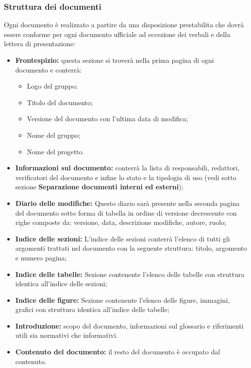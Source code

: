 \documentclass[NormeDiProgetto.tex]{subfiles}
\begin{document}
	\subsubsection{Struttura dei documenti}
		Ogni documento è realizzato a partire da una disposizione prestabilita che dovrà essere conforme per ogni documento ufficiale ad eccezione dei verbali e della lettera di presentazione:
		\begin{itemize}
			\item \textbf{Frontespizio:} questa sezione si troverà nella prima pagina di ogni documento e conterrà:
			\begin{itemize}
				\item Logo del gruppo;
				\item Titolo del documento;
				\item Versione del documento con l'ultima data di modifica;
				\item Nome del gruppo;
				\item Nome del progetto.
			\end{itemize}
			
			\item \textbf{Informazioni sul documento:} conterrà la lista di responsabili,
			redattori, verificatori del documento e infine lo stato e la tipologia di uso (vedi sotto sezione \textbf{Separazione documenti interni ed esterni});
			
			\item \textbf{Diario delle modifiche:}
			Questo diario sarà presente nella seconda pagina del documento sotto forma di tabella in ordine di versione decrescente con righe composte da: versione, data, descrizione modifiche, autore, ruolo;
			
			\item \textbf{Indice delle sezioni:}
			L'indice delle sezioni conterrà l'elenco di tutti gli argomenti trattati nel documento con la seguente struttura: titolo, argomento e numero pagina;
			
			\item \textbf{Indice delle tabelle:}
			Sezione contenente l'elenco delle tabelle con struttura identica all'indice delle sezioni;
			
			\item \textbf{Indice delle figure:}
			Sezione contenente l'elenco delle figure, immagini, grafici con struttura identica all'indice delle tabelle;
			
			\item \textbf{Introduzione:}
			scopo del documento, informazioni sul glossario e riferimenti utili sia normativi che informativi.
			 
			\item \textbf{Contenuto del documento:} il resto del documento è occupato dal contenuto.
			
			
		\end{itemize}
		
\end{document}
